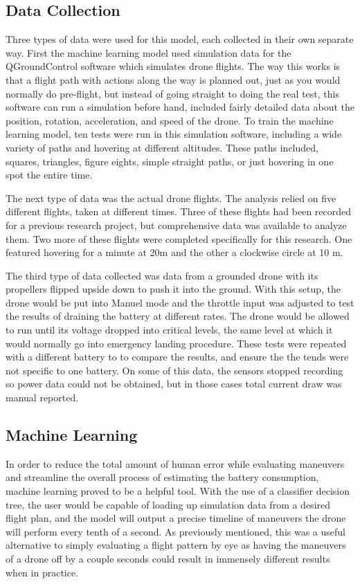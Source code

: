 \documentclass{article}
\begin{document}
\subsection{Data Collection}
Three types of data were used for this model, each collected in their own separate way. First the machine learning model used simulation data for the QGroundControl software which simulates drone flights. The way this works is that a flight path with actions along the way is planned out, just as you would normally do pre-flight, but instead of going straight to doing the real test, this software can run a simulation before hand, included fairly detailed data about the position, rotation, acceleration, and speed of the drone. To train the machine learning model, ten tests were run in this simulation software, including a wide variety of paths and hovering at different altitudes. These paths included, squares, triangles, figure eights, simple straight paths, or just hovering in one spot the entire time. \par

The next type of data was the actual drone flights. The analysis relied on five different flights, taken at different times. Three of these flights had been recorded for a previous research project, but comprehensive data was available to analyze them. Two more of these flights were completed specifically for this research. One featured hovering for a minute at 20m and the other a clockwise circle at 10 m.\par

The third type of data collected was data from a grounded drone with its propellers flipped upside  down to push it into the ground. With this setup, the drone would be put into Manuel mode and the throttle input was adjusted to test the results of draining the battery at different rates. The drone would be allowed to run until its voltage dropped into critical levels, the same level at which it would normally go into emergency landing procedure. These tests were repeated with a different battery to to compare the results, and ensure the the tends were not specific to one battery. On some of this data, the sensors stopped recording so power data could not be obtained, but in those cases total current draw was manual reported.


\subsection{Machine Learning}
In order to reduce the total amount of human error while evaluating maneuvers and streamline the overall process of estimating the battery consumption, machine learning proved to be a helpful tool. With the use of a classifier decision tree, the user would be capable of loading up simulation data from a desired flight plan, and the model will output a precise timeline of maneuvers the drone will perform every tenth of a second. As previously mentioned, this was a useful alternative to simply evaluating a flight pattern by eye as having the maneuvers of a drone off by a couple seconds could result in immensely different results when in practice. 
\end{document}
